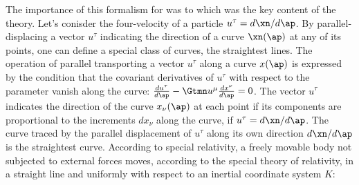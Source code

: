 


The importance of this formalism for \gr was to which was the key content of the theory. Let's conisder the four-velocity of a particle $u^\tau=d\xn/d\ap$. By parallel-displacing a vector $u^\tau$ indicating the direction of a curve $\xn(\ap)$ at any of its points, one can define a special class of curves, the straightest lines. The operation of parallel transporting a vector $u^\tau$ along a curve $x(\ap)$ is expressed by the condition that the covariant derivatives of $u^\tau$ with respect to the parameter \ap vanish along the curve: $\frac{d u^{\tau}}{d \ap}-\Gtmn u^{\mu} \frac{d x^\nu}{d\ap}=0$. The vector $u^\tau$ indicates the direction of the curve $x_\nu(\ap)$ at each point if its components are proportional to the increments $dx_\nu$ along the curve, \ie if $u^\tau=d\xn/d\ap$. The curve traced by the parallel displacement of $u^\tau$ along its own direction $d\xn/d\ap$ is the straightest curve. According to special relativity, a freely movable body not subjected to external forces moves, according to the special theory of relativity, in a straight line and uniformly with respect to an inertial coordinate system $K$:

